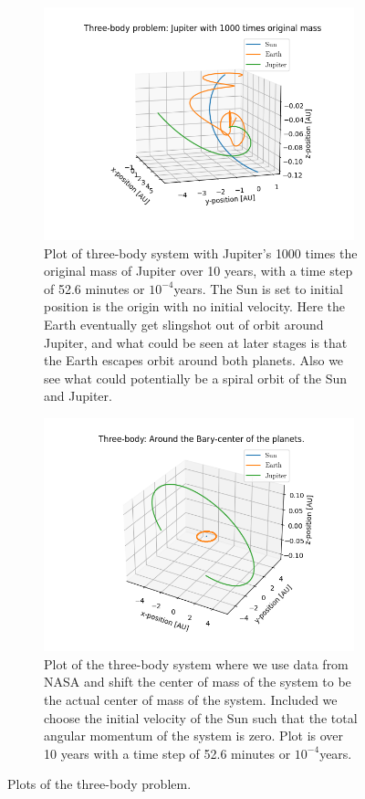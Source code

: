 \documentclass[%
reprint,
nofootinbib,
amsmath,amssymb,
aps,
]{revtex4-1}
\begin{document}
\begin{figure}[t]
	\begin{subfigure}{9cm}
		\centering\includegraphics[width=9cm]{../code/classes/figure/TB1000.png}
		\caption{Plot of three-body system with Jupiter's 1000 times the original mass of Jupiter over 10 years, with a time step of 52.6 minutes or $10^{-4}$years. The Sun is set to initial position is the origin with no initial velocity. Here the Earth eventually get slingshot out of orbit around Jupiter, and what could be seen at later stages is that the Earth escapes orbit around both planets. Also we see what could potentially be a spiral orbit of the Sun and Jupiter.}
		\label{fig:TB1000}
	\end{subfigure}%
	\begin{subfigure}{9cm}
		\centering\includegraphics[width=9cm]{../code/classes/figure/TBB.png}
		\caption{Plot of the three-body system where we use data from NASA and shift the center of mass of the system to be the actual center of mass of the system. Included we choose the initial velocity of the Sun such that the total angular momentum of the system is zero. Plot is over 10 years with a time step of 52.6 minutes or $10^{-4}$years.}
		\label{fig:TBJE}
	\end{subfigure}
	\caption{Plots of the three-body problem.}
	\label{fig:ThreeBody}
\end{figure}
\end{document}
